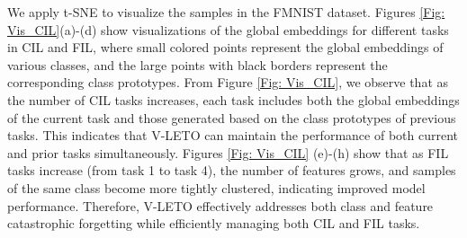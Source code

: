 We apply t-SNE \cite{cai2022theoretical} to visualize the samples in the FMNIST dataset. 
Figures \ref{Fig: Vis_CIL}(a)-(d) show visualizations of the global embeddings for different tasks in CIL and FIL, where small colored points represent the global embeddings of various classes, and the large points with black borders represent the corresponding class prototypes. 
From Figure \ref{Fig: Vis_CIL}, we observe that as the number of CIL tasks increases, each task includes both the global embeddings of the current task and those generated based on the class prototypes of previous tasks. 
This indicates that V-LETO can maintain the performance of both current and prior tasks simultaneously. 
Figures \ref{Fig: Vis_CIL} (e)-(h) show that as FIL tasks increase (from task 1 to task 4), the number of features grows, and samples of the same class become more tightly clustered, indicating improved model performance.
Therefore, V-LETO effectively addresses both class and feature catastrophic forgetting while efficiently managing both CIL and FIL tasks.

